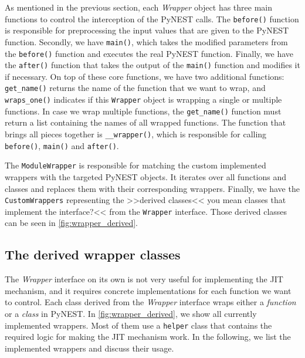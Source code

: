 As mentioned in the previous section, each \emph{Wrapper} object has three main functions to control the interception of the PyNEST calls. The \texttt{before()} function is responsible for preprocessing the input values that are given to the PyNEST function. Secondly, we have \texttt{main()}, which takes the modified parameters from the \texttt{before()} function and executes the real PyNEST function. Finally, we have the \texttt{after()} function that takes the output of the \texttt{main()} function and modifies it if necessary. On top of these core functions, we have two additional functions: \texttt{get\_name()} returns the name of the function that we want to wrap, and \texttt{wraps\_one()} indicates if this \texttt{Wrapper} object is wrapping a single or multiple functions. In case we wrap multiple functions, the \texttt{get\_name()} function must return a list containing the names of all wrapped functions. The function that brings all pieces together is \texttt{\_\_wrapper()}, which is responsible for calling \texttt{before()}, \texttt{main()} and \texttt{after()}.

The \texttt{ModuleWrapper} is responsible for matching the custom implemented wrappers with the targeted PyNEST objects. It iterates over all functions and classes and replaces them with their corresponding wrappers. Finally, we have the \texttt{CustomWrappers} representing the >>derived classes<< you mean classes that implement the interface?<< from the \texttt{Wrapper} interface. Those derived classes can be seen in \autoref{fig:wrapper_derived}.

\subsection{The derived wrapper classes}

The \emph{Wrapper} interface on its own is not very useful for implementing the JIT mechanism, and it requires concrete implementations for each function we want to control. Each class derived from the \emph{Wrapper} interface wraps either a \emph{function} or a \emph{class} in PyNEST. In \autoref{fig:wrapper_derived}, we show all currently implemented wrappers. Most of them use a \texttt{helper} class that contains the required logic for making the JIT mechanism work. In the following, we list the implemented wrappers and discuss their usage.


